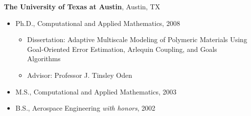 %
\textbf{The University of Texas at Austin}, 
Austin, TX
\begin{itemize}

\item Ph.D., 
        Computational and Applied Mathematics, 2008 
        \begin{itemize}
        \item Dissertation: Adaptive Multiscale Modeling of Polymeric Materials Using Goal-Oriented
        Error Estimation, Arlequin Coupling, and Goals Algorithms
        \item Advisor: Professor J. Tinsley Oden
        \end{itemize}

\item M.S., 
        Computational and Applied Mathematics, 2003 

\item B.S., 
        Aerospace Engineering \emph{with honors}, 2002

\end{itemize}
